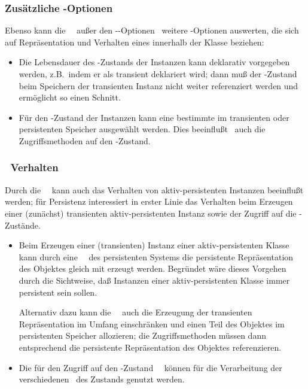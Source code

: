 \subsubsection{Zus\"{a}tzliche \protect\Slt-Optionen}
%
Ebenso kann die \spc\ \clsmc\ au\ss{}er den \std-\Slt\/-Op\-tio\-nen
\ weitere \Slt\/-Optionen auswerten, die sich auf
Repr\"{a}sentation und Verhalten eines \Slt[s]\/ innerhalb der Klasse
beziehen:
\begin{itemize}
%
\item Die Lebensdauer des \Slt\/-Zustands der Instanzen kann
deklarativ vorgegeben werden, z.B.\ indem er als transient deklariert
wird; dann mu\ss{} der \Slt\/-Zustand beim Speichern der transienten
Instanz nicht weiter referenziert werden und erm\"{o}glicht so einen
Schnitt.
%
\item F\"{u}r den \Slt\/-Zustand der Instanzen kann eine bestimmte
\representationform{} im transienten oder persistenten Speicher
ausgew\"{a}hlt werden. Dies beeinflu\ss{}t \ia\ auch die Zugriffsmethoden
auf den \Slt\/-Zustand.
%
\end{itemize}
%
\subsubsection{\protect\Spc[s]\ Verhalten}
%
Durch die \spc\ \clsmc\ kann auch das Verhalten von
ak\-tiv-per\-si\-sten\-ten Instanzen beeinflu\ss{}t werden; f\"{u}r
Persistenz interessiert in erster Linie das Verhalten beim Erzeugen
einer (zun\"{a}chst) transienten aktiv-persistenten Instanz sowie der
Zugriff auf die \Slt\/-Zust\"{a}nde.
\begin{itemize}
%
\item Beim Erzeugen einer (transienten) Instanz einer
aktiv-persistenten Klasse kann durch eine \spc\ \mtd\ des
persistenten Systems die persistente Repr\"{a}sentation des Objektes
gleich mit erzeugt werden. Begr\"{u}ndet w\"{a}re dieses Vorgehen durch die
Sichtweise, da\ss{} Instanzen einer aktiv-persistenten Klasse immer
persistent sein sollen.
%
\par{}Alternativ dazu kann die \spc\ \mtd\ auch die Erzeugung der
transienten Repr\"{a}sentation im Umfang einschr\"{a}nken und einen Teil
des Objektes im persistenten Speicher allozieren; die
Zugriffsmethoden m\"{u}ssen dann entsprechend die persistente
Re\-pr\"{a}\-sen\-ta\-tion des Objektes referenzieren.
%
\item Die f\"{u}r den Zugriff auf den \Slt\/-Zustand
\spc[n]\ \mtd[n]\ k\"{o}nnen f\"{u}r die Verarbeitung der verschiedenen
\representationforms\ des Zustands genutzt werden.
%
\end{itemize}
%
